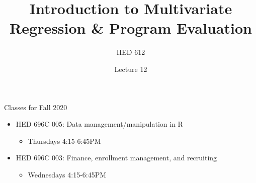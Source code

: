 \documentclass[8pt,ignorenonframetext,dvipsnames]{beamer}
\title{Introduction to Multivariate Regression \& Program Evaluation}
\subtitle{HED 612}
\author{Lecture 12}
\date{}
\providecommand{\tightlist}{%
  \setlength{\itemsep}{0pt}\setlength{\parskip}{0pt}}
\let\olditem\item
\renewcommand{\item}{%
  \olditem\vspace{4pt}
}
\begin{document}
\frame{\titlepage}

\begin{frame}
\tableofcontents[hideallsubsections]
\end{frame}
\begin{frame}{Classes for Fall 2020}
\protect\hypertarget{classes-for-fall-2020}{}

\begin{itemize}
\tightlist
\item
  HED 696C 005: Data management/manipulation in R

  \begin{itemize}
  \tightlist
  \item
    Thursdays 4:15-6:45PM
  \end{itemize}
\item
  HED 696C 003: Finance, enrollment management, and recruiting

  \begin{itemize}
  \tightlist
  \item
    Wednesdays 4:15-6:45PM
  \end{itemize}
\end{itemize}

\end{frame}
\end{document}
